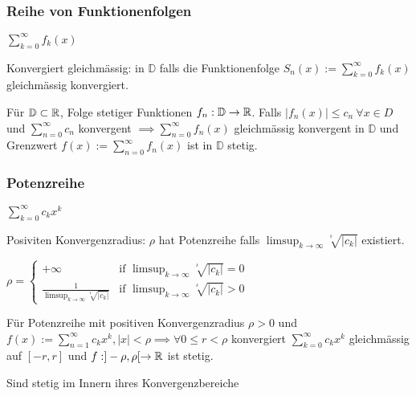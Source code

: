 \subsubsection{Reihe von Funktionenfolgen}
$\sum_{k=0}^{\infty} f_k(x)$
\begin{compactdesc}
    \item[Konvergiert gleichmässig:] in $\mathbb{D}$ falls die Funktionenfolge $S_n(x) := \sum_{k=0}^{\infty} f_k(x)$ gleichmässig konvergiert.
    \item Für $\mathbb{D} \subset \mathbb{R}$, Folge stetiger Funktionen $f_n:\mathbb{D} \to \mathbb{R}$. Falls $\left| f_n(x) \right| \le c_n \ \forall x \in D$ und $\sum_{n=0}^{\infty} c_n$ konvergent $\implies \sum_{n=0}^{\infty} f_n(x)$ gleichmässig konvergent in $\mathbb{D}$ und Grenzwert $f(x) := \sum_{n=0}^{\infty} f_n(x)$ ist in $\mathbb{D}$ stetig.
\end{compactdesc}

\subsubsection{Potenzreihe}
\begin{compactitem}
    \item $\sum_{k=0}^{\infty} c_kx^k$
\end{compactitem}
\begin{compactdesc}
\item[Posiviten Konvergenzradius:] $\rho$ hat Potenzreihe falls $\limsup_{k \to \infty} \sqrt[^k]{\left| c_k \right| }$ existiert.
    \begin{compactitem}
        \item $\rho = \begin{cases}
            + \infty & \text{if } \limsup_{k \to \infty} \sqrt[^k]{\left| c_k \right| } = 0\\
            \frac{1}{\limsup_{k \to \infty}\sqrt[^k]{\left| c_k \right| }} & \text{if } \limsup_{k \to \infty} \sqrt[^k]{\left| c_k \right| } > 0
        \end{cases}$
    \end{compactitem}
\end{compactdesc}
\begin{compactitem}
    \item Für Potenzreihe mit positiven Konvergenzradius $\rho > 0$ und $f(x):= \sum_{n=1}^{\infty} c_kx^k, |x| < \rho \implies \forall 0 \le r < \rho$ konvergiert $\sum_{k=0}^{\infty} c_kx^k$ gleichmässig auf $[-r, r]$ und $f:]-\rho, \rho[ \to \mathbb{R}$ ist stetig.
    \item Sind stetig im Innern ihres Konvergenzbereiche
\end{compactitem}

